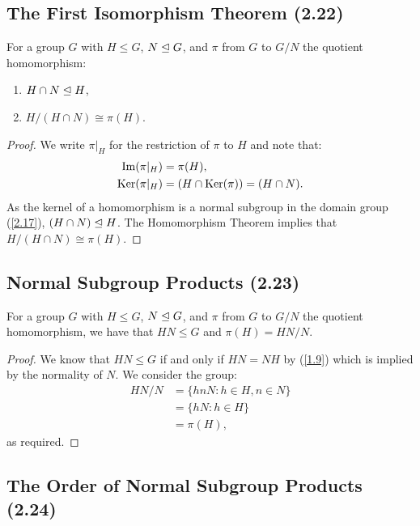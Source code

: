 \newpage

\subsection{The First Isomorphism Theorem (2.22)} \label{2.22} 

For a group $G$ with $H \leq G$, $N \trianglelefteq G$, and $\pi$ from $G$ to 
$G / N$ the quotient homomorphism: \begin{enumerate}
    \item $H \cap N \trianglelefteq H$,
    \item $H/(H \cap N) \cong \pi(H)$.
\end{enumerate}


\begin{proof}
    We write $\pi|_H$ for the restriction of $\pi$ to $H$
    and note that: \begin{align*}
        \operatorname{Im}(\pi|_H) &= \pi(H), \\
        \operatorname{Ker}(\pi|_H) &= (H \cap \operatorname{Ker}(\pi)) = (H \cap N).
    \end{align*} As the kernel of a homomorphism
    is a normal subgroup in the domain group (\ref{2.17}), \linebreak $(H \cap N) \trianglelefteq H$.
    The Homomorphism Theorem implies that $H / (H \cap N) \cong \pi(H)$.
\end{proof}

\subsection{Normal Subgroup Products (2.23)} \label{2.23}

For a group $G$ with $H \leq G$, $N \trianglelefteq G$, and $\pi$ from $G$ to 
$G / N$ the quotient homomorphism, we have that 
$HN \leq G$ and $\pi(H) = HN/N$.
\begin{proof}
    We know that $HN \leq G$ if and only if $HN = NH$ by (\ref{1.9})
    which is implied by the normality of $N$.
    We consider the group: \begin{align*}
        HN / N 
        &= \{hnN : h \in H, n \in N\} \\
        &= \{hN : h \in H\} \\
        &= \pi(H),
    \end{align*} as required.
\end{proof} 

\subsection{The Order of Normal Subgroup Products (2.24)} \label{2.24}

